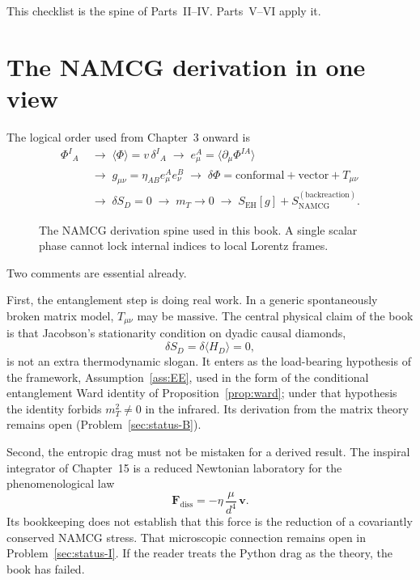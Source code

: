 This checklist is the spine of Parts~II--IV. Parts~V--VI apply it.

\section{The NAMCG derivation in one view}
\label{sec:ch1-spine}

The logical order used from Chapter~3 onward is
\begin{equation}
  \label{eq:spine}
  \begin{aligned}
    \Phi^I{}_A
    &\;\longrightarrow\;
    \langle\Phi\rangle=v\,\delta^I{}_A
    \;\longrightarrow\;
    e^A_\mu=\langle\partial_\mu\Phi^{IA}\rangle \\
    &\;\longrightarrow\;
    g_{\mu\nu}=\eta_{AB}e^A_\mu e^B_\nu
    \;\longrightarrow\;
    \delta\Phi=\text{conformal}+\text{vector}+T_{\mu\nu} \\
    &\;\longrightarrow\;
    \delta S_D=0
    \;\longrightarrow\;
    m_T\to 0
    \;\longrightarrow\;
    S_{\mathrm{EH}}[g]+S_{\mathrm{NAMCG}}^{\mathrm{(backreaction)}}.
  \end{aligned}
\end{equation}

\begin{figure}[ht]
  \centering
  
  \caption{The NAMCG derivation spine used in this book. A single
    scalar phase cannot lock internal indices to local Lorentz frames.}
  \label{fig:spine}
\end{figure}

Two comments are essential already.

First, the entanglement step is doing real work. In a generic
spontaneously broken matrix model, \(T_{\mu\nu}\) may be massive. The
central physical claim of the book is that Jacobson's stationarity
condition on dyadic causal diamonds,
\begin{equation}
  \label{eq:deltaS-preview}
  \delta S_D=\delta\langle H_D\rangle=0,
\end{equation}
is not an extra thermodynamic slogan. It enters as the load-bearing
hypothesis of the framework, Assumption~\ref{ass:EE}, used in the form
of the conditional entanglement Ward identity of
Proposition~\ref{prop:ward}; under that hypothesis the identity forbids
\(m_T^2\neq 0\) in the infrared. Its derivation from the matrix theory
remains open (Problem~\ref{sec:status-B}).

Second, the entropic drag must not be mistaken for a derived result.
The inspiral integrator of Chapter~15 is a reduced Newtonian
laboratory for the phenomenological law
\begin{equation}
  \label{eq:drag-preview}
  \mathbf{F}_{\mathrm{diss}}=-\eta\,\frac{\mu}{d^4}\,\mathbf{v}.
\end{equation}
Its bookkeeping does not establish that this force is the reduction
of a covariantly conserved NAMCG stress. That microscopic connection
remains open in Problem~\ref{sec:status-I}. If the reader treats the
Python drag as the theory, the book has failed.

